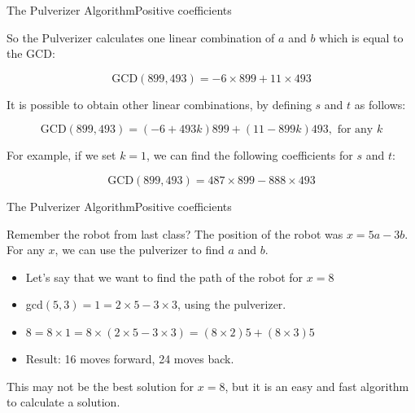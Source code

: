 \begin{frame}{The Pulverizer Algorithm}{Positive coefficients}

  So the Pulverizer calculates one linear combination of $a$ and $b$ which is equal to the GCD:

  \begin{equation*}
  \text{GCD}(899, 493) = -6\times 899 + 11\times 493
  \end{equation*}\bigskip

  It is possible to obtain other linear combinations, by defining $s$ and $t$ as follows:

  \begin{equation*}
    \text{GCD}(899, 493) = (-6 + 493k)899 + (11 - 899k)493, \text{ for any }k
  \end{equation*}\bigskip

  For example, if we set $k = 1$, we can find the following coefficients for $s$ and $t$:

  \begin{equation*}
    \text{GCD}(899, 493) = 487\times 899 - 888\times 493
  \end{equation*}

\end{frame}

\begin{frame}{The Pulverizer Algorithm}{Positive coefficients}

  Remember the robot from last class? The position of the robot was $x = 5a - 3b$. For any $x$, we can use the pulverizer to find $a$ and $b$.\bigskip

  \begin{itemize}
    \item Let's say that we want to find the path of the robot for $x = 8$
    \item gcd$(5,3) = 1 = 2\times5 - 3\times 3$, using the pulverizer.
    \item $8 = 8\times 1 = 8\times(2\times 5 - 3\times3) = (8\times2)5 + (8\times 3)5$
    \item Result: 16 moves forward, 24 moves back.
  \end{itemize}\bigskip

  This may not be the best solution for $x=8$, but it is an easy and fast algorithm to calculate a solution.
\end{frame}
